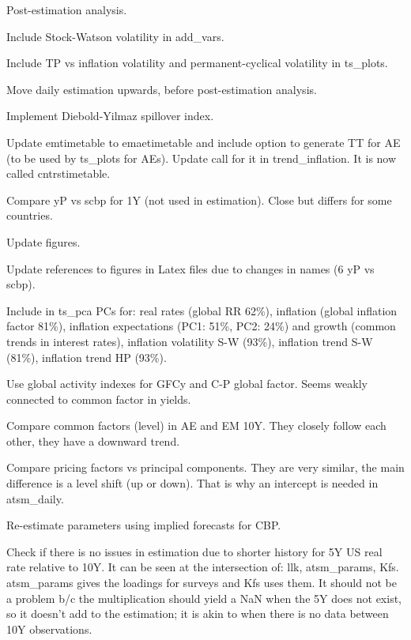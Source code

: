 \documentclass[12pt]{article}
\newcommand{\cmark}{\ding{51}}
\newcommand{\done}{\rlap{$\square$}{\raisebox{2pt}{\large\hspace{1pt}\cmark}}%
	\hspace{-2.5pt}}
\begin{document}
\begin{todolist}
\begin{todolist}
	\end{todolist}
	\item[\done] Post-estimation analysis.
	\begin{todolist}
		\item[\done] Include Stock-Watson volatility in add_vars.
		\item[\done] Include TP vs inflation volatility and permanent-cyclical volatility in ts_plots.
		\item[\done] Move daily estimation upwards, before post-estimation analysis.
		\item[\done] Implement Diebold-Yilmaz spillover index.
		\item[\done] Update emtimetable to emaetimetable and include option to generate TT for AE (to be used by ts_plots for AEs). Update call for it in trend_inflation. It is now called cntrstimetable.
		\item[\done] Compare yP vs scbp for 1Y (not used in estimation). Close but differs for some countries.
		\item[\done] Update figures.
		\item[\done] Update references to figures in Latex files due to changes in names (6 yP vs scbp).
		\item[\done] Include in ts_pca PCs for: real rates (global RR 62\%), inflation (global inflation factor 81\%), inflation expectations (PC1: 51\%, PC2: 24\%) and growth (common trends in interest rates), inflation volatility S-W (93\%), inflation trend S-W (81\%), inflation trend HP (93\%).
		\item[\done] Use global activity indexes for GFCy and C-P global factor. Seems weakly connected to common factor in yields.
		\item[\done] Compare common factors (level) in AE and EM 10Y. They closely follow each other, they have a downward trend.
		\item[\done] Compare pricing factors vs principal components. They are very similar, the main difference is a level shift (up or down). That is why an intercept is needed in atsm_daily.
	\end{todolist}
	\item[\done] Re-estimate parameters using implied forecasts for CBP.
	\begin{todolist}
		\item[\done] Check if there is no issues in estimation due to shorter history for 5Y US real rate relative to 10Y. It can be seen at the intersection of: llk, atsm_params, Kfs. atsm_params gives the loadings for surveys and Kfs uses them. It should not be a problem b/c the multiplication should yield a NaN when the 5Y does not exist, so it doesn't add to the estimation; it is akin to when there is no data between 10Y observations.

\end{todolist}
\end{todolist}
\end{document}
